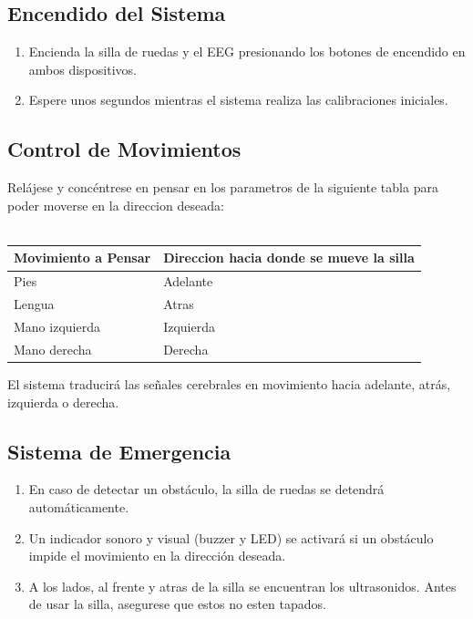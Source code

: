 \documentclass{article}
\begin{document}
\subsection{Encendido del Sistema}
\begin{enumerate}
    \item Encienda la silla de ruedas y el EEG presionando los botones de encendido en ambos dispositivos.
    \item Espere unos segundos mientras el sistema realiza las calibraciones iniciales.
\end{enumerate}

\subsection{Control de Movimientos}
Relájese y concéntrese en pensar en los parametros de la siguiente tabla para poder moverse en la direccion deseada:
\\
\\
\begin{table}[H]
    \renewcommand{\arraystretch}{1.5}
    \centering
    \begin{tabular}{|p{4cm}|p{4cm}|}
        \hline
        Movimiento a Pensar & Direccion hacia donde se mueve la silla \\
        \hline
        Pies & Adelante \\
        \hline
        Lengua & Atras \\
        \hline
        Mano izquierda & Izquierda \\
        \hline
        Mano derecha & Derecha \\
        \hline
    \end{tabular}
\end{table}
El sistema traducirá las señales cerebrales en movimiento hacia adelante, atrás, izquierda o derecha.

\subsection{Sistema de Emergencia}
\begin{enumerate}
    \item En caso de detectar un obstáculo, la silla de ruedas se detendrá automáticamente.
    \item Un indicador sonoro y visual (buzzer y LED) se activará si un obstáculo impide el movimiento en la dirección deseada.
    \item A los lados, al frente y atras de la silla se encuentran los ultrasonidos. Antes de usar la silla, asegurese que estos no esten tapados.
\end{enumerate}
\end{document}
